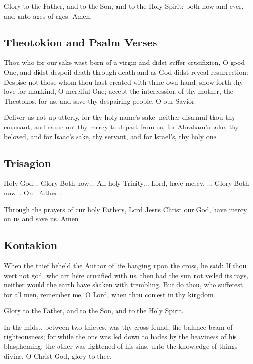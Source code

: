 Glory to the Father, and to the Son, and to the Holy Spirit: both now and ever, and unto ages of ages. Amen.

\subsection{Theotokion and Psalm Verses}

Thou who for our sake wast born of a virgin and didst suffer crucifixion, O good One, and didst despoil death through death and as God didst reveal resurrection: Despise not those whom thou hast created with thine own hand; show forth thy love for mankind, O merciful One; accept the intercession of thy mother, the Theotokos, for us, and save thy despairing people, O our Savior.

Deliver us not up utterly, for thy holy name's sake, neither disannul thou thy covenant, and cause not thy mercy to depart from us, for Abraham's sake, thy beloved, and for Isaac's sake, thy servant, and for Israel's, thy holy one. 

\subsection{Trisagion}

Holy God... Glory  Both now... All-holy Trinity... Lord, have mercy. ... Glory  Both now... Our Father...

Through the prayers of our holy Fathers, Lord Jesus Christ our God, have mercy on us and save us. Amen.

\subsection{Kontakion}


When the thief beheld the Author of life hanging upon the cross, he said: If thou wert not god, who art here crucified with us, then had the sun not veiled its rays, neither would the earth have shaken with trembling. But do thou, who sufferest for all men, remember me, O Lord, when thou comest in thy kingdom.

Glory to the Father, and to the Son, and to the Holy Spirit.

In the midst, between two thieves, was thy cross found, the balance-beam of righteousness; for while the one was led down to hades by the heaviness of his blaspheming, the other was lightened of his sins, unto the knowledge of things divine, O Christ God, glory to thee.

